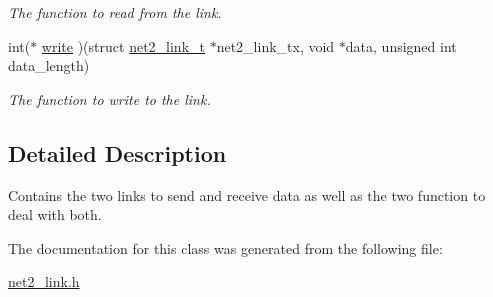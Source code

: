 \begin{DoxyCompactItemize}
\begin{DoxyCompactList}\small\item\em The function to read from the link. \end{DoxyCompactList}\item 
\hypertarget{structnet2__link__t_ac1513cd0177b78d51e564224be84ef01}{int($\ast$ \hyperlink{structnet2__link__t_ac1513cd0177b78d51e564224be84ef01}{write} )(struct \hyperlink{structnet2__link__t}{net2\-\_\-link\-\_\-t} $\ast$net2\-\_\-link\-\_\-tx, void $\ast$data, unsigned int data\-\_\-length)}\label{structnet2__link__t_ac1513cd0177b78d51e564224be84ef01}

\begin{DoxyCompactList}\small\item\em The function to write to the link. \end{DoxyCompactList}\end{DoxyCompactItemize}


\subsection{Detailed Description}
Contains the two links to send and receive data as well as the two function to deal with both. 

The documentation for this class was generated from the following file\-:\begin{DoxyCompactItemize}
\item 
\hyperlink{net2__link_8h}{net2\-\_\-link.\-h}\end{DoxyCompactItemize}
